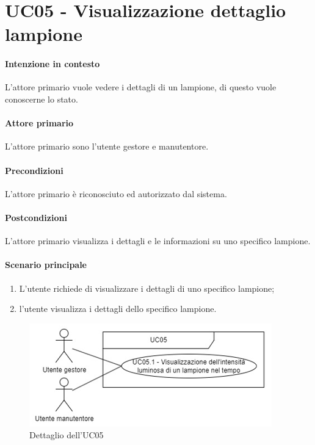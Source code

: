 \section{UC05 - Visualizzazione dettaglio lampione}\label{uc:05}
\paragraph{Intenzione in contesto} L'attore primario vuole vedere i dettagli di un lampione, di questo vuole conoscerne lo stato.
\paragraph{Attore primario} L'attore primario sono l'utente gestore e manutentore.
\paragraph{Precondizioni}L'attore primario è riconosciuto ed autorizzato dal sistema.
\paragraph{Postcondizioni} L'attore primario visualizza i dettagli e le informazioni su uno specifico lampione.
\paragraph{Scenario principale}
\begin{enumerate}
    \item L'utente richiede di visualizzare i dettagli di uno specifico lampione;
    \item l'utente visualizza i dettagli dello specifico lampione.
\end{enumerate}

\begin{figure}[h]
    \includegraphics[width=\textwidth]{contenuti/img/casi_uso_grafici-uc5.png}
    \caption{Dettaglio dell'UC05}
    \label{fig:uc05}
\end{figure}

